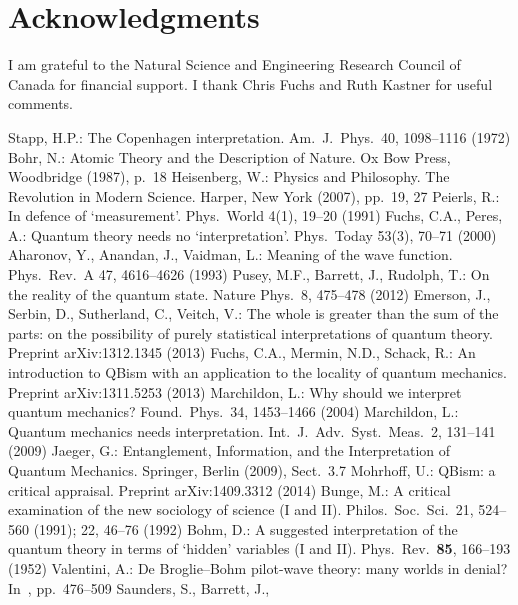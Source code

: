 \documentclass[12pt]{article}
\begin{document}
\section*{Acknowledgments}
%
I am grateful to the Natural Science and
Engineering Research Council of Canada for
financial support.  I thank Chris Fuchs and
Ruth Kastner for useful comments.
%
\begin{thebibliography}{99}
%
 Stapp, H.P.:
The Copenhagen interpretation.
Am.\ J.\ Phys.\ 40, 1098--1116 (1972)
%
 Bohr, N.:
Atomic Theory and the Description of Nature.
Ox Bow Press, Woodbridge (1987), p.~18
%
 Heisenberg, W.:
Physics and Philosophy.  The Revolution
in Modern Science.
Harper, New York (2007), pp.~19, 27
%
 Peierls, R.:
In defence of `measurement'.
Phys.\ World 4(1), 19--20 (1991)
%
 Fuchs, C.A., Peres, A.:
Quantum theory needs no `interpretation'.
Phys.\ Today 53(3), 70--71 (2000)
%
 Aharonov, Y.,
Anandan, J., Vaidman, L.:
Meaning of the wave function.
Phys.\ Rev.\ A 47, 4616--4626 (1993)
%
 Pusey, M.F.,
Barrett, J., Rudolph, T.:
On the reality of the quantum state.
Nature Phys.\ 8, 475--478 (2012)
%
 Emerson, J.,
Serbin, D., Sutherland, C., Veitch, V.:
The whole is greater than the sum of the
parts: on the possibility of purely
statistical interpretations of quantum theory.
Preprint arXiv:1312.1345 (2013)
%
 Fuchs, C.A.,
Mermin, N.D., Schack, R.:
An introduction to QBism with an application
to the locality of quantum mechanics.
Preprint arXiv:1311.5253 (2013)
%
 Marchildon, L.:
Why should we interpret quantum mechanics?
Found.\ Phys.\ 34, 1453--1466 (2004)
%
 Marchildon, L.:
Quantum mechanics needs interpretation.
Int.\ J.\ Adv.\ Syst.\ Meas.\ 2, 131--141 (2009)
%
 Jaeger, G.:
Entanglement, Information, and the
Interpretation of Quantum Mechanics.
Springer, Berlin (2009), Sect.~3.7
%
 Mohrhoff, U.:
QBism: a critical appraisal.
Preprint arXiv:1409.3312 (2014)
%
 Bunge, M.:
A critical examination of the new
sociology of science (I and II).
Philos.\ Soc.\ Sci.\ 21, 524--560 (1991);
22, 46--76 (1992)
%
 Bohm, D.:
A suggested interpretation of the quantum
theory in terms of `hidden' variables (I and II).
Phys.\ Rev.\ \textbf{85}, 166--193 (1952)
%
 Valentini, A.:
De Broglie--Bohm pilot-wave theory:
many worlds in denial?
In~\cite{saunders}, pp.~476--509
%
 Saunders, S., Barrett, J.,

\end{thebibliography}
\end{document}
